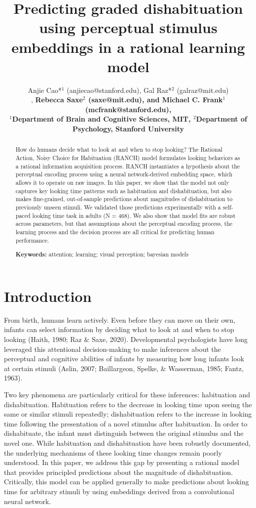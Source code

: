 \documentclass[10pt, letterpaper]{article}
\title{Predicting graded dishabituation using perceptual stimulus
embeddings in a rational learning model}
\author{ Anjie Cao*$^1$ (anjiecao@stanford.edu), Gal Raz*$^2$ (galraz@mit.edu)\\, \bf{Rebecca Saxe$^2$ (saxe@mit.edu)},
 and  \bf{Michael C. Frank$^1$ (mcfrank@stanford.edu)}, \\
$^1$Department of Brain and Cognitive Sciences, MIT, $^2$Department of Psychology, Stanford University \\ }
\begin{document}
\maketitle

\begin{abstract}
How do humans decide what to look at and when to stop looking? The
Rational Action, Noisy Choice for Habituation (RANCH) model formulates
looking behaviors as a rational information acquisition process. RANCH
instantiates a hypothesis about the perceptual encoding process using a
neural network-derived embedding space, which allows it to operate on
raw images. In this paper, we show that the model not only captures key
looking time patterns such as habituation and dishabituation, but also
makes fine-grained, out-of-sample predictions about magnitudes of
dishabituation to previously unseen stimuli. We validated those
predictions experimentally with a self-paced looking time task in adults
(N = 468). We also show that model fits are robust across parameters,
but that assumptions about the perceptual encoding process, the learning
process and the decision process are all critical for predicting human
performance.

\textbf{Keywords:}
attention; learning; visual perception; bayesian models
\end{abstract}

\hypertarget{introduction}{%
\section{Introduction}\label{introduction}}

From birth, humans learn actively. Even before they can move on their
own, infants can select information by deciding what to look at and when
to stop looking (Haith, 1980; Raz \& Saxe, 2020). Developmental
psychologists have long leveraged this attentional decision-making to
make inferences about the perceptual and cognitive abilities of infants
by measuring how long infants look at certain stimuli (Aslin, 2007;
Baillargeon, Spelke, \& Wasserman, 1985; Fantz, 1963).

Two key phenomena are particularly critical for these inferences:
habituation and dishabituation. Habituation refers to the decrease in
looking time upon seeing the same or similar stimuli repeatedly;
dishabituation refers to the increase in looking time following the
presentation of a novel stimulus after habituation. In order to
dishabituate, the infant must distinguish between the original stimulus
and the novel one. While habituation and dishabituation have been
robustly documented, the underlying mechanisms of these looking time
changes remain poorly understood. In this paper, we address this gap by
presenting a rational model that provides principled predictions about
the magnitude of dishabituation. Critically, this model can be applied
generally to make predictions about looking time for arbitrary stimuli
by using embeddings derived from a convolutional neural network.
\end{document}
